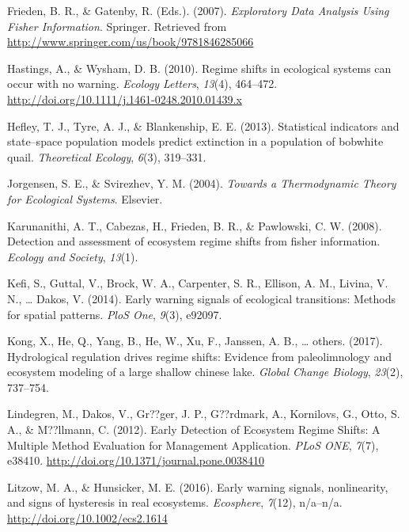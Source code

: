 \documentclass[12pt,twoside,openany]{reedthesis}
\begin{document}
\hypertarget{ref-frieden_exploratory_2007}{}
Frieden, B. R., \& Gatenby, R. (Eds.). (2007). \emph{Exploratory Data
Analysis Using Fisher Information}. Springer. Retrieved from
\url{http://www.springer.com/us/book/9781846285066}

\hypertarget{ref-hastings_regime_2010}{}
Hastings, A., \& Wysham, D. B. (2010). Regime shifts in ecological
systems can occur with no warning. \emph{Ecology Letters}, \emph{13}(4),
464--472. \url{http://doi.org/10.1111/j.1461-0248.2010.01439.x}

\hypertarget{ref-hefley2013statistical}{}
Hefley, T. J., Tyre, A. J., \& Blankenship, E. E. (2013). Statistical
indicators and state--space population models predict extinction in a
population of bobwhite quail. \emph{Theoretical Ecology}, \emph{6}(3),
319--331.

\hypertarget{ref-jorgensen_towards_2004}{}
Jorgensen, S. E., \& Svirezhev, Y. M. (2004). \emph{Towards a
Thermodynamic Theory for Ecological Systems}. Elsevier.

\hypertarget{ref-karunanithi_detection_2008}{}
Karunanithi, A. T., Cabezas, H., Frieden, B. R., \& Pawlowski, C. W.
(2008). Detection and assessment of ecosystem regime shifts from fisher
information. \emph{Ecology and Society}, \emph{13}(1).

\hypertarget{ref-kefi2014early}{}
Kefi, S., Guttal, V., Brock, W. A., Carpenter, S. R., Ellison, A. M.,
Livina, V. N., \ldots{} Dakos, V. (2014). Early warning signals of
ecological transitions: Methods for spatial patterns. \emph{PloS One},
\emph{9}(3), e92097.

\hypertarget{ref-kong2017hydrological}{}
Kong, X., He, Q., Yang, B., He, W., Xu, F., Janssen, A. B., \ldots{}
others. (2017). Hydrological regulation drives regime shifts: Evidence
from paleolimnology and ecosystem modeling of a large shallow chinese
lake. \emph{Global Change Biology}, \emph{23}(2), 737--754.

\hypertarget{ref-lindegren_early_2012}{}
Lindegren, M., Dakos, V., Gr??ger, J. P., G??rdmark, A., Kornilovs, G.,
Otto, S. A., \& M??llmann, C. (2012). Early Detection of Ecosystem
Regime Shifts: A Multiple Method Evaluation for Management Application.
\emph{PLoS ONE}, \emph{7}(7), e38410.
\url{http://doi.org/10.1371/journal.pone.0038410}

\hypertarget{ref-litzow_early_2016}{}
Litzow, M. A., \& Hunsicker, M. E. (2016). Early warning signals,
nonlinearity, and signs of hysteresis in real ecosystems.
\emph{Ecosphere}, \emph{7}(12), n/a--n/a.
\url{http://doi.org/10.1002/ecs2.1614}
\end{document}
